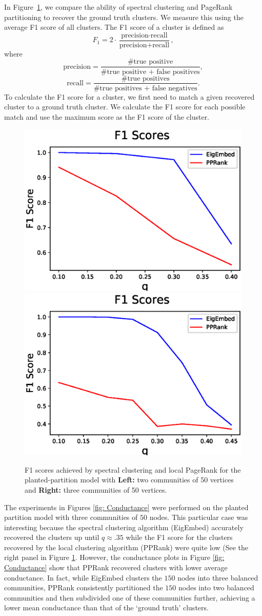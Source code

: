 \documentclass[11pt]{article}
\begin{document}
In Figure~\ref{fig: F1 Scores}, we compare the ability of spectral clustering and PageRank partitioning to recover the ground truth clusters. We measure this using the average F1 score of all clusters. The F1 score of a cluster is defined as
$$F_1 = 2 \cdot \frac{\text{precision}\cdot \text{recall}}{\text{precision}+\text{recall}},$$
where
$$\text{precision} = \frac{\#\text{true positive}}{\#\text{true positive + false positives}},$$
$$\text{recall} = \frac{\#\text{true positives}}{\#\text{true positives + false negatives}}.$$
To calculate the F1 score for a cluster, we first need to match a given recovered cluster to a ground truth cluster. We calculate the F1 score for each possible match and use the maximum score as the F1 score of the cluster.
\begin{figure}
\includegraphics[width=.5\textwidth]{2b_p8_3.eps}
\includegraphics[width=.5\textwidth]{3b_p8_3.eps}
\caption{F1 scores achieved by spectral clustering and local PageRank for the planted-partition model with \textbf{Left:} two communities of 50 vertices and \textbf{Right:} three communities of 50 vertices.}\label{fig: F1 Scores}
\end{figure}

The experiments in Figures \ref{fig: Conductance} were performed on the planted partition model with three communities of $50$ nodes. This particular case was interesting because the spectral clustering algorithm (EigEmbed) accurately recovered the clusters up until $q\approx .35$ while the F1 score for the clusters recovered by the local clustering algorithm (PPRank) were quite low (See the right panel in Figure \ref{fig: F1 Scores}. However, the conductance plots in Figure \ref{fig: Conductance} show that PPRank recovered clusters with lower average conductance. In fact, while EigEmbed clusters the $150$ nodes into three balanced communities, PPRank consistently partitioned the $150$ nodes into two balanced communities and then subdivided one of these communities further, achieving a lower mean conductance than that of the `ground truth' clusters.
\end{document}

